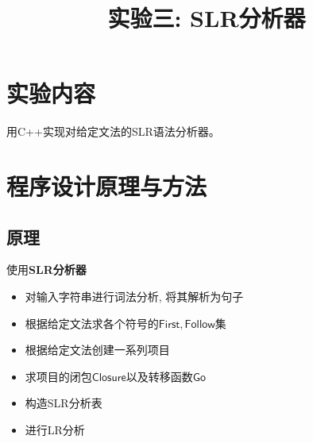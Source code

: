 \documentclass{zpt}
\title{实验三: SLR分析器}
\begin{document}
    \maketitle
    \tableofcontents
    \clearpage
    \section{实验内容}
    用C++实现对给定文法的SLR语法分析器。
    \section{程序设计原理与方法}
    \subsection{原理}
    使用\textbf{SLR分析器}
    \begin{itemize}
        \item 对输入字符串进行词法分析, 将其解析为句子
        \item 根据给定文法求各个符号的$\mathsf{First},\mathsf{Follow}$集
        \item 根据给定文法创建一系列项目
        \item 求项目的闭包$\mathsf{Closure}$以及转移函数$\mathsf{Go}$
        \item 构造SLR分析表
        \item 进行LR分析
    \end{itemize}
\end{document}
